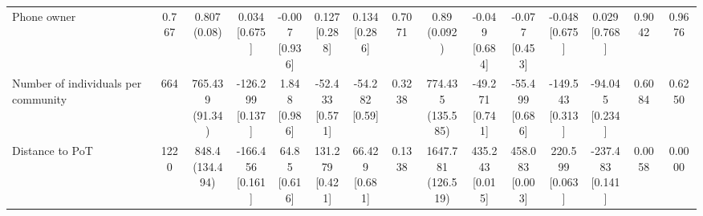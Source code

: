 {\begin{tabular}[t]{lcccccccccccccc}
\hspace{1em}Phone owner & 0.767 & \makecell[c]{0.807\\(0.08)} & \makecell[c]{0.034\\{[0.675]}} & \makecell[c]{-0.007\\{[0.936]}} & \makecell[c]{0.127\\{[0.288]}} & \makecell[c]{0.134\\{[0.286]}} & 0.7071 & \makecell[c]{0.89\\(0.092)} & \makecell[c]{-0.049\\{[0.684]}} & \makecell[c]{-0.077\\{[0.453]}} & \makecell[c]{-0.048\\{[0.675]}} & \makecell[c]{0.029\\{[0.768]}} & 0.9042 & 0.9676\\
\hspace{1em}Number of individuals per community & 664 & \makecell[c]{765.439\\(91.34)} & \makecell[c]{-126.299\\{[0.137]}} & \makecell[c]{1.848\\{[0.986]}} & \makecell[c]{-52.433\\{[0.571]}} & \makecell[c]{-54.282\\{[0.59]}} & 0.3238 & \makecell[c]{774.435\\(135.585)} & \makecell[c]{-49.271\\{[0.741]}} & \makecell[c]{-55.499\\{[0.686]}} & \makecell[c]{-149.543\\{[0.313]}} & \makecell[c]{-94.045\\{[0.234]}} & 0.6084 & 0.6250\\
\hspace{1em}Distance to PoT & 1220 & \makecell[c]{848.4\\(134.494)} & \makecell[c]{-166.456\\{[0.161]}} & \makecell[c]{64.85\\{[0.616]}} & \makecell[c]{131.279\\{[0.421]}} & \makecell[c]{66.429\\{[0.681]}} & 0.1338 & \makecell[c]{1647.781\\(126.519)} & \makecell[c]{435.243\\{[0.015]}} & \makecell[c]{458.083\\{[0.003]}} & \makecell[c]{220.599\\{[0.063]}} & \makecell[c]{-237.483\\{[0.141]}} & 0.0058 & 0.0000\\

\end{tabular}}
